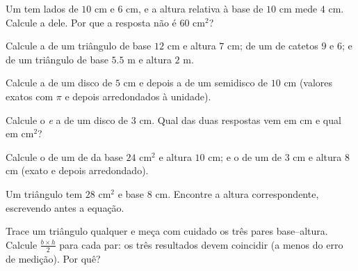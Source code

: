 \begin{exercise}[$\star$]\label{exo:g7:areas:2}
Um  tem lados de $10$ cm e $6$ cm, e a altura relativa à
base de $10$ cm mede $4$ cm. Calcule a  dele. Por que a resposta
não é $60$ cm$^2$?
\end{exercise}

\begin{exercise}[$\star$]\label{exo:g7:areas:3}
Calcule a  de um triângulo de base $12$ cm e altura $7$ cm; de um
 de catetos $9$ e $6$; e de um triângulo de base
$5.5$ m e altura $2$ m.
\end{exercise}

\begin{exercise}[$\star$]\label{exo:g7:areas:4}
Calcule a  de um disco de  $5$ cm e depois a de um semidisco de
 $10$ cm (valores exatos com $\pi$ e depois arredondados à
unidade).
\end{exercise}

\begin{exercise}[$\star$]\label{exo:g7:areas:5}
Calcule o  \emph{e} a  de um disco de  $3$ cm. Qual
das duas respostas vem em cm e qual em cm$^2$?
\end{exercise}

\begin{exercise}[$\star$]\label{exo:g7:areas:6}
Calcule o  de um  de  da base $24$ cm$^2$ e altura
$10$ cm; e o de um  de  $3$ cm e altura $8$ cm (exato e
depois arredondado).
\end{exercise}

\begin{exercise}[$\star$]\label{exo:g7:areas:7}
Um triângulo tem  $28$ cm$^2$ e base $8$ cm. Encontre a altura
correspondente, escrevendo antes a equação.
\end{exercise}

\begin{exercise}[$\star\star$]\label{exo:g7:areas:8}
Trace um triângulo qualquer e meça com cuidado os três pares
base--altura. Calcule $\frac{b \times h}{2}$ para cada par: os três
resultados devem coincidir (a menos do erro de medição). Por quê?
\end{exercise}

